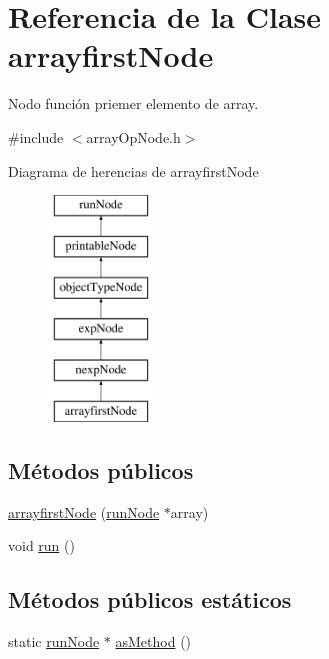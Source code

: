 \hypertarget{classarrayfirstNode}{\section{Referencia de la Clase arrayfirst\-Node}
\label{classarrayfirstNode}
}


Nodo función priemer elemento de array.  




{\ttfamily \#include $<$array\-Op\-Node.\-h$>$}

Diagrama de herencias de arrayfirst\-Node\begin{figure}[H]
\begin{center}
\leavevmode
\includegraphics[height=6.000000cm]{classarrayfirstNode}
\end{center}
\end{figure}
\subsection*{Métodos públicos}
\begin{DoxyCompactItemize}
\item 
\hyperlink{classarrayfirstNode_a90ce782fc1cc3514e6f12839d3ceccea}{arrayfirst\-Node} (\hyperlink{classrunNode}{run\-Node} $\ast$array)
\item 
void \hyperlink{classarrayfirstNode_a6966767db3660da890d9d3c7363f8e90}{run} ()
\end{DoxyCompactItemize}
\subsection*{Métodos públicos estáticos}
\begin{DoxyCompactItemize}
\item 
static \hyperlink{classrunNode}{run\-Node} $\ast$ \hyperlink{classarrayfirstNode_aa94b0227fcfd30303ed314921ce83cbc}{as\-Method} ()
\end{DoxyCompactItemize}


